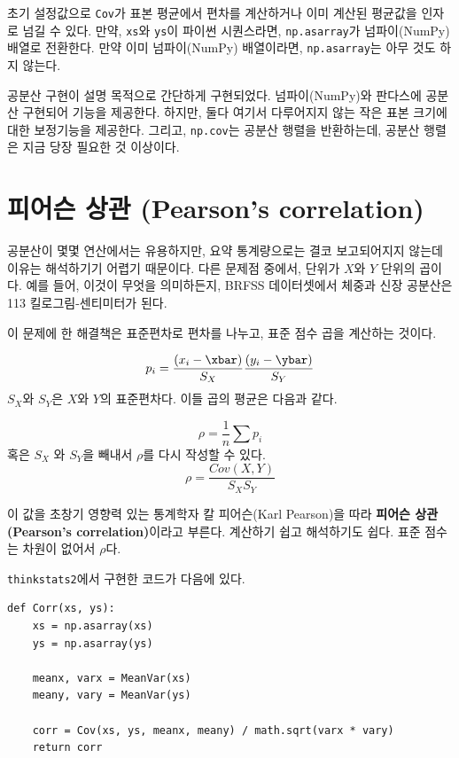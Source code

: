 초기 설정값으로 {\tt Cov}가 표본 평균에서 편차를 계산하거나 이미 계산된 평균값을 인자로 넘길 수 있다. 만약, {\tt xs}와 {\tt ys}이 파이썬 시퀀스라면, {\tt np.asarray}가 넘파이(NumPy) 배열로 전환한다.
만약 이미 넘파이(NumPy) 배열이라면, {\tt np.asarray}는 아무 것도 하지 않는다.


공분산 구현이 설명 목적으로 간단하게 구현되었다.
넘파이(NumPy)와 판다스에 공분산 구현되어 기능을 제공한다.
하지만, 둘다 여기서 다루어지지 않는 작은 표본 크기에 대한 보정기능을 제공한다. 그리고, {\tt np.cov}는 공분산 행렬을 반환하는데, 공분산 행렬은 지금 당장 필요한 것 이상이다.



\section{피어슨 상관 (Pearson's correlation)}

공분산이 몇몇 연산에서는 유용하지만, 요약 통계량으로는 결코 보고되어지지 않는데 이유는 해석하기기 어렵기 때문이다.
다른 문제점 중에서, 단위가 $X$와 $Y$ 단위의 곱이다.
예를 들어, 이것이 무엇을 의미하든지, BRFSS 데이터셋에서 체중과 신장 공분산은 113 킬로그림-센티미터가 된다.


이 문제에 한 해결책은 표준편차로 편차를 나누고, 표준 점수 곱을 계산하는 것이다.

%
\[ p_i = \frac{(x_i - \xbar)}{S_X} \frac{(y_i - \ybar)}{S_Y} \]
%
$S_X$와 $S_Y$은 $X$와 $Y$의 표준편차다. 이들 곱의 평균은 다음과 같다.

%
\[ \rho = \frac{1}{n} \sum p_i \]
%
혹은 $S_X$ 와 $S_Y$을 빼내서 $\rho$를 다시 작성할 수 있다.
%
\[ \rho = \frac{Cov(X,Y)}{S_X S_Y} \]
%

이 값을 초창기 영향력 있는 통계학자 칼 피어슨(Karl Pearson)을 따라 {\bf 피어슨 상관 (Pearson's correlation)}이라고 부른다.
계산하기 쉽고 해석하기도 쉽다. 표준 점수는 차원이 없어서 $\rho$다.


{\tt thinkstats2}에서 구현한 코드가 다음에 있다.

\begin{verbatim}
def Corr(xs, ys):
    xs = np.asarray(xs)
    ys = np.asarray(ys)

    meanx, varx = MeanVar(xs)
    meany, vary = MeanVar(ys)

    corr = Cov(xs, ys, meanx, meany) / math.sqrt(varx * vary)
    return corr
\end{verbatim}

